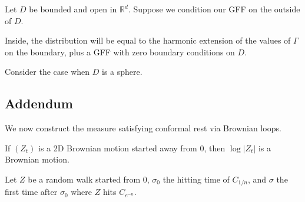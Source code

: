 \documentclass[12pt]{article}
\begin{document}
Let $D$ be bounded and open in $\mathbb{R}^{d}$. Suppose we condition our GFF on the outside of $D$.

Inside, the distribution will be equal to the harmonic extension of the values of $\Gamma$ on the boundary, plus a GFF with zero boundary conditions on $D$.

Consider the case when $D$ is a sphere.

\subsection{Addendum}%
\label{sub:add}

We now construct the measure satisfying conformal rest via Brownian loops.

\begin{remark}
	If $(Z_t)$ is a 2D Brownian motion started away from $0$, then $\log |Z_t|$ is a Brownian motion.
\end{remark}

Let $Z$ be a random walk started from $0$, $\sigma_0$ the hitting time of $C_{1/n}$, and $\sigma$ the first time after $\sigma_0$ where $Z$ hits $C_{e^{-n}}$.

\newpage

\printindex
\end{document}
